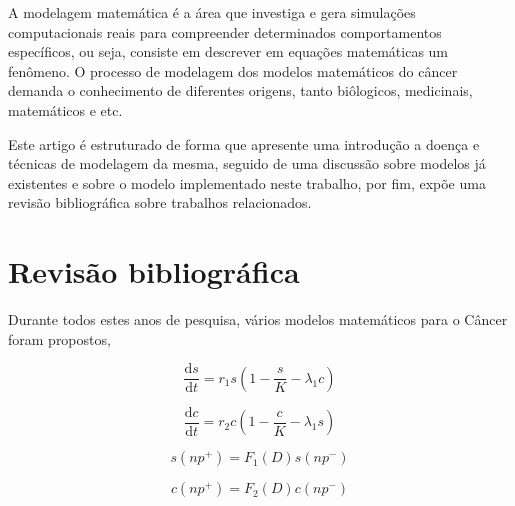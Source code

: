 \documentclass[12pt]{article}
\begin{document}
A modelagem matemática é a área que investiga e gera simulações computacionais reais para compreender determinados comportamentos específicos, ou seja, consiste em descrever em equações matemáticas um fenômeno.
O processo de modelagem dos modelos matemáticos do câncer demanda o conhecimento de diferentes origens, tanto biôlogicos, medicinais, matemáticos e etc.


Este artigo é estruturado de forma que apresente uma introdução a doença e técnicas de modelagem da mesma, seguido de uma discussão sobre modelos já existentes e sobre o modelo implementado neste trabalho, por fim, expõe uma revisão bibliográfica sobre trabalhos relacionados.

\section{Revisão bibliográfica} %
Durante todos estes anos de pesquisa, vários modelos matemáticos para o Câncer foram propostos,


\begin{equation} \label{eq:normalgrowth}
  \frac{\mathrm{d} s}{\mathrm{d} t} = r_{1} s \left ( 1 - \frac{s}{K} - \lambda_{1} c \right )
\end{equation}

\begin{equation} \label{eq:cancergrowth}
  \frac{\mathrm{d} c}{\mathrm{d} t} = r_{2} c \left ( 1 - \frac{c}{K} - \lambda_{1} s \right )
\end{equation}

\begin{equation}
  s(np^{+}) = F_{1}(D) s(np^{-})
\end{equation}

\begin{equation}
  c(np^{+}) = F_{2}(D) c(np^{-})
\end{equation}

\end{document}
